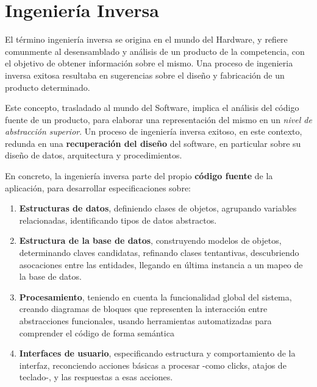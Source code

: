 \section{Ingeniería Inversa}

El término ingeniería inversa se origina en el mundo del Hardware,
y refiere comunmente al desensamblado 
y análisis de un producto de la competencia,
con el objetivo de obtener información sobre el mismo.
Una proceso de ingenieria inversa exitosa resultaba en 
sugerencias sobre el diseño y fabricación de un producto determinado.

Este concepto, trasladado al mundo del Software,
implica el análisis del código fuente de un producto,
para elaborar una representación del mismo 
en un \textit{nivel de abstracción superior}.
Un proceso de ingeniería inversa exitoso,
en este contexto,
redunda en una \textbf{recuperación del diseño} del software,
en particular sobre su diseño de datos,
arquitectura y procedimientos.

En concreto, la ingeniería inversa parte del propio \textbf{código fuente}
de la aplicación,
para desarrollar especificaciones sobre:
\begin{enumerate}
    \item \textbf{Estructuras de datos}, 
    definiendo clases de objetos,
    agrupando variables relacionadas, 
    identificando tipos de datos abstractos.
    \item \textbf{Estructura de la base de datos}, 
    construyendo modelos de objetos, 
    determinando claves candidatas,
    refinando clases tentantivas,
    descubriendo asocaciones entre las entidades,
    llegando en última instancia a un mapeo de la base de datos.
    \item \textbf{Procesamiento},
    teniendo en cuenta la funcionalidad global del sistema,
    creando diagramas de bloques que representen la interacción entre 
    abstracciones funcionales,
    usando herramientas automatizadas para comprender el código
    de forma semántica
    \item \textbf{Interfaces de usuario},
    especificando estructura y comportamiento de la interfaz,
    reconciendo acciones básicas a procesar -como clicks, atajos de teclado-,
    y las respuestas a esas acciones.
\end{enumerate}